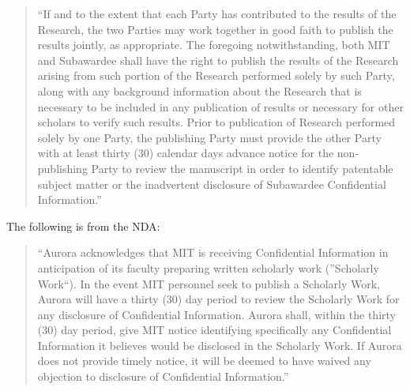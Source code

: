 \begin{quote}
``If and to the extent that each Party has contributed to the results of the Research, the two Parties may work together in good faith to publish the results jointly, as appropriate. The foregoing notwithstanding, both MIT and Subawardee shall have the right to publish the results of the Research arising from such portion of the Research performed solely by such Party, along with any background information about the Research that is necessary to be included in any publication of results or necessary for other scholars to verify such results. Prior to publication of Research performed solely by one Party, the publishing Party must provide the other Party with at least thirty (30) calendar days advance notice for the non-publishing Party to review the manuscript in order to identify patentable subject matter or the inadvertent disclosure of Subawardee Confidential Information.''
\end{quote}

The following is from the NDA:

\begin{quote}
``Aurora acknowledges that MIT is receiving Confidential Information in anticipation of its faculty preparing written scholarly work (''Scholarly Work``). In the event MIT personnel seek to publish a Scholarly Work, Aurora will have a thirty (30) day period to review the Scholarly Work for any disclosure of Confidential Information. Aurora shall, within the thirty (30) day period, give MIT notice identifying specifically any Confidential Information it believes would be disclosed in the Scholarly Work. If Aurora does not provide timely notice, it will be deemed to have waived any objection to disclosure of Confidential Information.''
\end{quote}

